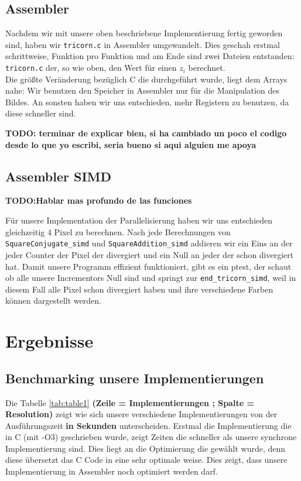 \documentclass[course=erap]{aspdoc}
\begin{document}
\subsection{Assembler}

Nachdem wir mit unsere oben beschriebene Implementierung fertig geworden sind, haben wir \lstinline{tricorn.c} in Assembler umgewandelt. Dies geschah erstmal schrittweise, Funktion pro Funktion und am Ende sind zwei Dateien entstanden: \lstinline{tricorn.c} der, so wie oben, den Wert f\"ur einen $z_i$ berechnet. \\

Die gr\"o{\ss}te Ver\"anderung bez\"uglich C die durchgef\"uhrt wurde, liegt dem Arrays nahe: Wir benutzen den Speicher in Assembler nur f\"ur die Manipulation des Bildes. An sonsten haben wir uns entschieden, mehr Registern zu benutzen, da diese schneller sind. 

\textbf{TODO: terminar de explicar bien, si ha cambiado un poco el codigo desde lo que yo escribi, seria bueno si aqui alguien me apoya}

\subsection{Assembler SIMD}
\textbf{TODO:Hablar mas profundo de las funciones}

Für unsere Implementation der Parallelisierung haben wir uns entschieden gleichzeitig 4 Pixel zu berechnen. Nach jede Berechnungen von \lstinline{SquareConjugate_simd} und \lstinline{SquareAddition_simd} addieren wir ein Eins an der jeder Counter der Pixel der divergiert und ein Null an jeder der schon divergiert hat. Damit unsere Programm effizient funktioniert, gibt es ein ptest, der schaut ob alle unsere Incrementors Null sind und springt zur \lstinline{end_tricorn_simd}, weil in diesem Fall alle Pixel schon divergiert haben und ihre verschiedene Farben k\"onnen dargestellt werden.

\section{Ergebnisse}\label{section:ergebnisse}

\subsection{Benchmarking unsere Implementierungen}\label{sub:bench}

Die Tabelle \ref{tab:table1} \textbf{(Zeile = Implementierungen ; Spalte = Resolution)} zeigt wie sich unsere verschiedene Implementierungen von der Ausführungszeit \textbf{in Sekunden} unterscheiden. Erstmal die Implementierung die in C (mit -O3) geschrieben wurde, zeigt Zeiten die schneller als unsere synchrone Implementierung sind. Dies liegt an die Optimierung die gew\"ahlt wurde, denn diese \"ubersetzt das C Code in eine sehr optimale weise. Dies zeigt, dass unsere Implementierung in Assembler noch optimiert werden darf. \\
\end{document}

